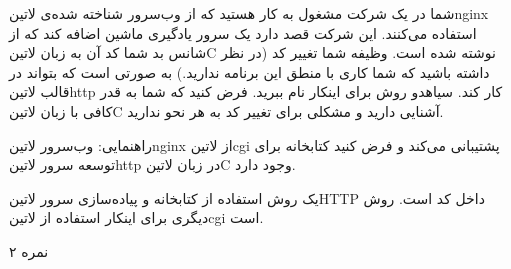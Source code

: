 
شما در یک شرکت مشغول به کار هستید که از وب‌سرور شناخته شده‌ی ‌لاتین{nginx} استفاده می‌کنند. این شرکت قصد دارد یک سرور یادگیری ماشین اضافه کند که از شانس بد شما کد آن به زبان ‌لاتین{C} نوشته شده است.
وظیفه شما تغییر کد (در نظر داشته باشید که شما کاری با منطق این برنامه ندارید.) به صورتی است که بتواند در قالب ‌لاتین{http} کار کند.
‌سیاه{دو روش} برای اینکار نام ببرید. فرض کنید که شما به قدر کافی با زبان ‌لاتین{C} آشنایی دارید و مشکلی برای تغییر کد به هر نحو ندارید.

راهنمایی: وب‌سرور ‌لاتین{nginx} از ‌لاتین{cgi} پشتیبانی می‌کند و فرض کنید کتابخانه برای توسعه سرور ‌لاتین{http} در زبان ‌لاتین{C} وجود دارد.

\begin{پاسخ}

یک روش استفاده از کتابخانه و پیاده‌سازی سرور ‌لاتین{HTTP} داخل کد است.
روش دیگری برای اینکار استفاده از ‌لاتین{cgi} است.

\end{پاسخ}

۲ نمره
